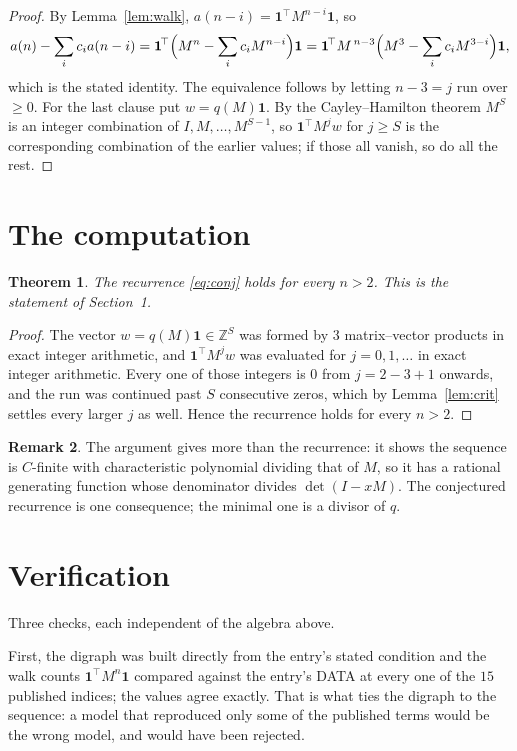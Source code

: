 \documentclass[11pt,a4paper]{article}
\theoremstyle{plain}
\newtheorem{theorem}{Theorem}
\theoremstyle{definition}
\newtheorem{remark}[theorem]{Remark}
\begin{document}
\begin{proof}
By Lemma~\ref{lem:walk}, $a(n-i)=\mathbf{1}^{\!\top}M^{n-i}\mathbf{1}$, so
\[
a(n)-\sum_i c_i a(n-i)
=\mathbf{1}^{\!\top}\Bigl(M^{n}-\sum_i c_i M^{n-i}\Bigr)\mathbf{1}
=\mathbf{1}^{\!\top}M^{\,n-3}\Bigl(M^{3}-\sum_i c_i M^{3-i}\Bigr)\mathbf{1},
\]
which is the stated identity. The equivalence follows by letting $n-3=j$ run over
$\ge0$. For the last clause put $w=q(M)\mathbf{1}$. By the Cayley--Hamilton theorem
$M^{S}$ is an integer combination of $I,M,\dots,M^{S-1}$, so
$\mathbf{1}^{\!\top}M^{j}w$ for $j\ge S$ is the corresponding combination of the
earlier values; if those all vanish, so do all the rest.
\end{proof}

\section{The computation}

\begin{theorem}
The recurrence \eqref{eq:conj} holds for every $n>2$. This is the statement of
Section~1.
\end{theorem}

\begin{proof}
The vector $w=q(M)\mathbf{1}\in\mathbb{Z}^{S}$ was formed by $3$ matrix--vector
products in exact integer arithmetic, and $\mathbf{1}^{\!\top}M^{j}w$ was evaluated for
$j=0,1,\dots$ in exact integer arithmetic. Every one of those integers is $0$ from
$j=2-3+1$ onwards, and the run was continued past $S$ consecutive zeros, which by
Lemma~\ref{lem:crit} settles every larger $j$ as well. Hence the recurrence holds for
every $n>2$.
\end{proof}

\begin{remark}
The argument gives more than the recurrence: it shows the sequence is $C$-finite with
characteristic polynomial dividing that of $M$, so it has a rational generating function
whose denominator divides $\det(I-xM)$. The conjectured recurrence is one consequence; the
minimal one is a divisor of $q$.
\end{remark}

\section{Verification}

Three checks, each independent of the algebra above.

First, the digraph was built directly from the entry's stated condition and the walk counts
$\mathbf{1}^{\!\top}M^{n}\mathbf{1}$ compared against the entry's DATA at every one of
the $15$ published indices; the values agree exactly. That is what ties the digraph to
the sequence: a model that reproduced only some of the published terms would be the wrong
model, and would have been rejected.
\end{document}
